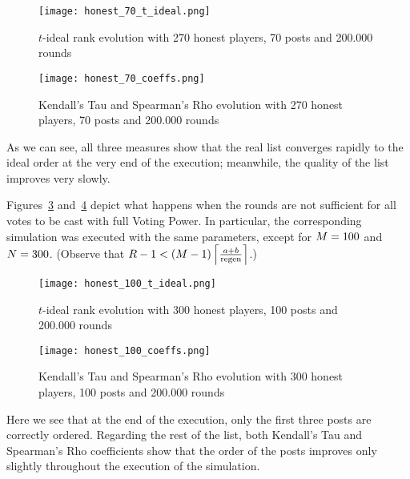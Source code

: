       \begin{figure}[!htbp]
        \texttt{[image: honest\_70\_t\_ideal.png]}
        \caption{$t$-ideal rank evolution with 270 honest players, 70 posts and
        200.000 rounds}
        \label{fig:honest:70:tideal}
      \end{figure}

      \begin{figure}[!htbp]
        \texttt{[image: honest\_70\_coeffs.png]}
        \caption{Kendall's Tau and Spearman's Rho evolution with 270 honest
        players, 70 posts and 200.000 rounds}
        \label{fig:honest:70:coeffs}
      \end{figure}

      As we can see, all three measures show that the real list converges
      rapidly to the ideal order at the very end of the execution; meanwhile,
      the quality of the list improves very slowly.

      Figures~\ref{fig:honest:100:tideal} and~\ref{fig:honest:100:coeffs} depict
      what happens when the rounds are not sufficient for all votes to be cast
      with full Voting Power. In particular, the corresponding simulation was
      executed with the same parameters, except for $\postlen = 100$ and
      $\playerlen = 300$. (Observe that $\rounds - 1 < \left(\postlen -
      1\right)\ceil*{\frac{a + b}{\regen}}$.)

      \begin{figure}[!htbp]
        \texttt{[image: honest\_100\_t\_ideal.png]}
        \caption{$t$-ideal rank evolution with 300 honest players, 100 posts and
        200.000 rounds}
        \label{fig:honest:100:tideal}
      \end{figure}

      \begin{figure}[!htbp]
        \texttt{[image: honest\_100\_coeffs.png]}
        \caption{Kendall's Tau and Spearman's Rho evolution with 300 honest
        players, 100 posts and 200.000 rounds}
        \label{fig:honest:100:coeffs}
      \end{figure}

      Here we see that at the end of the execution, only the first three posts
      are correctly ordered. Regarding the rest of the list, both Kendall's Tau
      and Spearman's Rho coefficients show that the order of the posts improves
      only slightly throughout the execution of the simulation.

